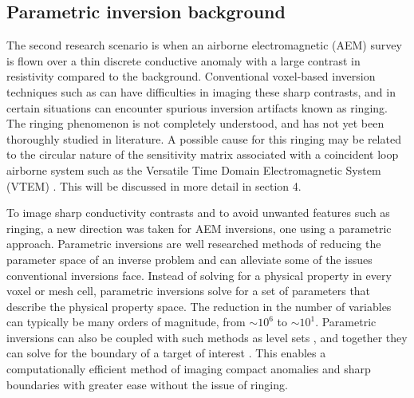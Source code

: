 \documentclass[letterpaper,11pt]{article}
\begin{document}
\subsection{Parametric inversion background}
The second research scenario is when an airborne electromagnetic (AEM) survey is flown over a thin discrete conductive anomaly with a large contrast in resistivity compared to the background. Conventional voxel-based inversion techniques such as \cite{Haber2007,Oldenburg2013,Haber2014} can have difficulties in imaging these sharp contrasts, and in certain situations can encounter spurious inversion artifacts known as ringing. The ringing phenomenon is not completely understood, and has not yet been thoroughly studied in literature.  A possible cause for this ringing may be related to the circular nature of the sensitivity matrix associated with a coincident loop airborne system such as the Versatile Time Domain Electromagnetic System (VTEM) \cite[]{Allard2007}. This will be discussed in more detail in section 4. 


To image sharp conductivity contrasts and to avoid unwanted features such as ringing, a new direction was taken for AEM inversions, one using a parametric approach. Parametric inversions are well researched methods of reducing the parameter space of an inverse problem \cite[]{Dorn2000,Pidlisecky2011,Zhdanov2013} and can alleviate some of the issues conventional inversions face.  Instead of solving for a physical property in every voxel or mesh cell, parametric inversions solve for a set of parameters that describe the physical property space. The reduction in the number of variables can typically be many orders of magnitude, from $\sim 10^6$ to $\sim 10^1$.  Parametric inversions can also be coupled with such methods as level sets \cite[]{Osher1988,Osher2001}, and together they can solve for the boundary of a target of interest \cite[]{Dorn2000,VandenDoel2006,Aghasi2011}. This enables a computationally efficient method of imaging compact anomalies and sharp boundaries with greater ease without the issue of ringing. 

\end{document}
